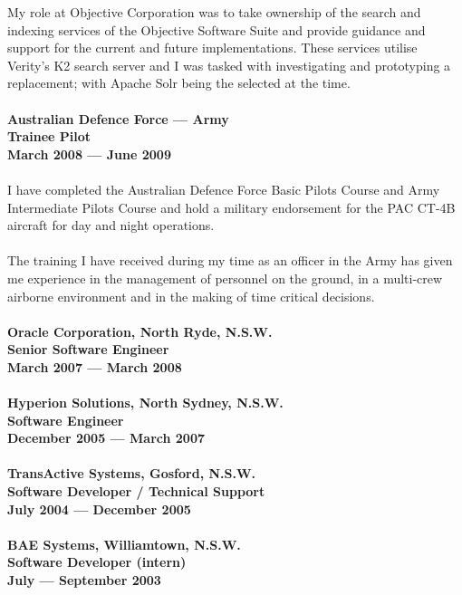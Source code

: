 \documentclass[a4paper]{article}
\begin{document}
My role at Objective Corporation was to take ownership of the search and indexing services of the Objective Software Suite and provide guidance and support for the current and future implementations. These services utilise Verity's K2 search server and I was tasked with investigating and prototyping a replacement; with Apache Solr being the selected at the time.\\\\
\textbf{Australian Defence Force --- Army\\Trainee Pilot\\March 2008 --- June 2009}\\\\
I have completed the Australian Defence Force Basic Pilots Course and Army Intermediate Pilots Course and hold a military endorsement for the PAC CT-4B aircraft for day and night operations.\\\\
The training I have received during my time as an officer in the Army has given me experience in the management of personnel on the ground, in a multi-crew airborne environment and in the making of time critical decisions.\\\\
\textbf{Oracle Corporation, North Ryde, N.S.W.\\Senior Software Engineer\\March 2007 --- March 2008}\\\\
\textbf{Hyperion Solutions, North Sydney, N.S.W.\\Software Engineer\\December 2005 --- March 2007} \\\\
\textbf{TransActive Systems, Gosford, N.S.W.\\Software Developer / Technical Support\\July 2004 --- December 2005}\\\\
\textbf{BAE Systems, Williamtown, N.S.W.\\Software Developer (intern)\\July --- September 2003}
\end{document}
